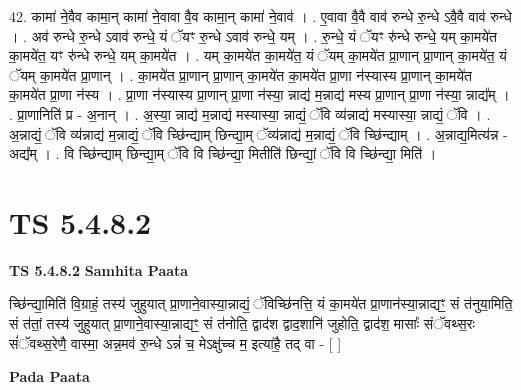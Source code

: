 \documentclass[17pt]{extarticle}
\begin{document}
42. कामा॑ ने॒वैव कामा॒न् कामा॑ ने॒वावा वै॒व कामा॒न् कामा॑ ने॒वाव॑ । . ए॒वावा वै॒वै वाव॑ रुन्धे रु॒न्धे ऽवै॒वै वाव॑ रुन्धे । . अव॑ रुन्धे रु॒न्धे ऽवाव॑ रुन्धे॒ यं ॅयꣳ रु॒न्धे ऽवाव॑ रुन्धे॒ यम् । . रु॒न्धे॒ यं ॅयꣳ रु॑न्धे रुन्धे॒ यम् का॒मये॑त का॒मये॑त॒ यꣳ रु॑न्धे रुन्धे॒ यम् का॒मये॑त । . यम् का॒मये॑त का॒मये॑त॒ यं ॅयम् का॒मये॑त प्रा॒णान् प्रा॒णान् का॒मये॑त॒ यं ॅयम् का॒मये॑त प्रा॒णान् । . का॒मये॑त प्रा॒णान् प्रा॒णान् का॒मये॑त का॒मये॑त प्रा॒णा न॑स्यास्य प्रा॒णान् का॒मये॑त का॒मये॑त प्रा॒णा न॑स्य । . प्रा॒णा न॑स्यास्य प्रा॒णान् प्रा॒णा न॑स्या॒ न्नाद्य॑ म॒न्नाद्य॑ मस्य प्रा॒णान् प्रा॒णा न॑स्या॒ न्नाद्य᳚म् । . प्रा॒णानिति॑ प्र - अ॒नान् । . अ॒स्या॒ न्नाद्य॑ म॒न्नाद्य॑ मस्यास्या॒ न्नाद्यं॒ ॅवि व्य॑न्नाद्य॑ मस्यास्या॒ न्नाद्यं॒ ॅवि । . अ॒न्नाद्यं॒ ॅवि व्य॑न्नाद्य॑ म॒न्नाद्यं॒ ॅवि च्छि॑न्द्याम् छिन्द्या॒म् ॅव्य॑न्नाद्य॑ म॒न्नाद्यं॒ ॅवि च्छि॑न्द्याम् । . अ॒न्नाद्य॒मित्य॑न्न - अद्य᳚म् । . वि च्छि॑न्द्याम् छिन्द्या॒म् ॅवि वि च्छि॑न्द्या॒ मितीति॑ छिन्द्यां॒ ॅवि वि च्छि॑न्द्या॒ मिति॑ । \newline
\pagebreak
{}

\section{ TS 5.4.8.2 }

\textbf{TS 5.4.8.2 } \newline
\textbf{Samhita Paata} \newline

च्छि॑न्द्या॒मिति॑ वि॒ग्राहं॒ तस्य॑ जुहुयात् प्रा॒णाने॒वास्या॒न्नाद्यं॒ ॅविच्छि॑नत्ति॒ यं का॒मये॑त प्रा॒णान॑स्या॒न्नाद्यꣳ॒॒ सं त॑नुया॒मिति॒ सं त॑तां॒ तस्य॑ जुहुयात् प्रा॒णाने॒वास्या॒न्नाद्यꣳ॒॒ सं त॑नोति॒ द्वाद॑श द्वाद॒शानि॑ जुहोति॒ द्वाद॑श॒ मासाः᳚ संॅवथ्स॒रः सं॑ॅवथ्स॒रेणै॒ वास्मा॒ अन्न॒मव॑ रु॒न्धे ऽन्नं॑ च॒ मेऽक्षु॑च्च म॒ इत्या॑है॒ तद् वा - [  ] \newline

\textbf{Pada Paata} \newline
\end{document}
